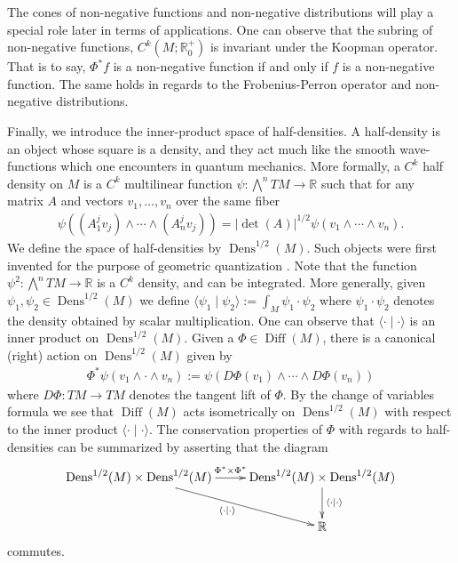 \documentclass[12pt]{amsart}
\newcommand{\R}{\ensuremath{\mathbb{R}}}
\DeclareMathOperator{\Diff}{Diff}
\DeclareMathOperator{\Dens}{Dens}
\begin{document}
The cones of non-negative functions and non-negative distributions will play a special role later in terms of applications.
One can observe that the subring of non-negative functions, $C^k(M ; \R^+_0)$ is invariant under the Koopman operator.
That is to say, $\Phi^*f$ is a non-negative function if and only if $f$ is a non-negative function.
The same holds in regards to the Frobenius-Perron operator and non-negative distributions.

Finally, we introduce the inner-product space of half-densities.
A half-density is an object whose square is a density, and they act much like
the smooth wave-functions which one encounters in quantum mechanics.
More formally, a $C^k$ half density on $M$ is a $C^k$ multilinear function $\psi : \bigwedge^n TM \to \mathbb{R}$
such that for any matrix $A$ and vectors $v_1,\dots,v_n$ over the same fiber
\begin{align*}
	\psi( (A_1^j v_j) \wedge \cdots \wedge (A_n^j v_j) ) =  | \det(A) |^{1/2} \psi(v_1 \wedge \cdots \wedge v_n).
\end{align*}
We define the space of half-densities by $\Dens^{1/2}(M)$.
Such objects were first invented for the purpose of geometric quantization \cite[see Chapter 4]{GuilleminSternberg1970}.
Note that the function $\psi^2 : \bigwedge^n TM \to \R$ is a $C^k$ density, and can be integrated.
More generally, given $\psi_1,\psi_2 \in \Dens^{1/2}(M)$ we define $\langle \psi_1 \mid \psi_2 \rangle := \int_M \psi_1 \cdot \psi_2$
where $\psi_1 \cdot \psi_2 $ denotes the density obtained by scalar multiplication.
One can observe that $\langle \cdot \mid \cdot \rangle$ is an inner product on $\Dens^{1/2}(M)$.
Given a $\Phi \in \Diff(M)$, there is a canonical (right) action on $\Dens^{1/2}(M)$ given by
\begin{align*}
	\Phi^* \psi( v_1 \wedge \cdot \wedge v_n) := \psi( D\Phi(v_1) \wedge \cdots \wedge D\Phi(v_n) )
\end{align*}
where $D\Phi : TM \to TM$ denotes the tangent lift of $\Phi$.
By the change of variables formula we see that $\Diff(M)$ acts isometrically on $\Dens^{1/2}(M)$ with respect to 
the inner product $\langle \cdot \mid \cdot \rangle$.
The conservation properties of $\Phi$ with regards to half-densities can be summarized by asserting that the diagram
\begin{equation*}
	\xymatrix{
		\Dens^{1/2}(M) \times \Dens^{1/2}(M) \ar[dr]_{\langle \cdot \mid \cdot \rangle} \ar[r]^{\Phi^* \times \Phi^*} & \Dens^{1/2}(M) \times \Dens^{1/2}(M) \ar[d]^{\langle \cdot \mid \cdot \rangle} \\
		&\mathbb{R}
	}
\end{equation*}
commutes.
\end{document}
